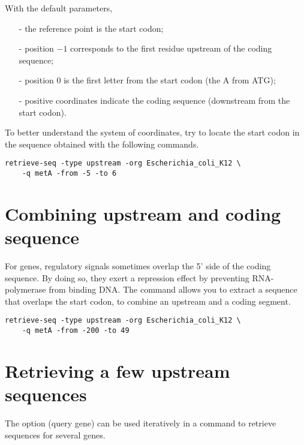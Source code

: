 \begin{samepage}
With the default parameters, 
\begin{itemize}
\item[-] the reference point is the start codon;
\item[-] position $-1$ corresponds to the first residue upstream of
  the coding sequence; 
\item[-] position 0 is the first letter from the start codon (the A from
  ATG);
\item[-] positive coordinates indicate the coding sequence (downstream
  from the start codon).
\end{itemize}
\end{samepage}

To better understand the system of coordinates, try to locate the
start codon in the sequence obtained with the following commands.

{\color{Blue} \begin{footnotesize}
\begin{verbatim}
retrieve-seq -type upstream -org Escherichia_coli_K12 \
    -q metA -from -5 -to 6
\end{verbatim} \end{footnotesize}
}


\section{Combining upstream and coding sequence}

For  genes, regulatory signals sometimes overlap the 5'
side of the coding sequence. By doing so, they exert a repression
effect by preventing RNA-polymerase from binding DNA. The command
\program{retrieve-seq} allows you to extract a sequence that overlaps
the start codon, to combine an upstream and a coding segment.

{\color{Blue} \begin{footnotesize}
\begin{verbatim}
retrieve-seq -type upstream -org Escherichia_coli_K12 \
    -q metA -from -200 -to 49
\end{verbatim} \end{footnotesize}
}

\section{Retrieving a few upstream sequences}

The option  (query gene) can be used iteratively in a
command to retrieve sequences for several genes.

